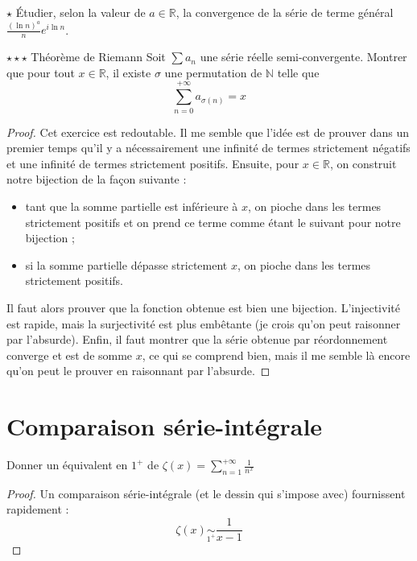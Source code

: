 \documentclass[french,a4paper]{article}
\newcommand{\N}{\mathbb{N}}
\newcommand{\R}{\mathbb{R}}
\theoremstyle{plain}
\theoremstyle{definition}
\theoremstyle{remark}
\begin{document}
\begin{ex}[Moulin.38]{$\star$}
	Étudier, selon la valeur de $a\in\R$, la convergence de la série de terme général $\displaystyle\frac{(\ln n)^a}{n}e^{i\ln n}$.
\end{ex}

\begin{ex}[X]{$\star\star\star$ Théorème de Riemann}
	Soit $\sum a_n$ une série réelle semi-convergente. Montrer que pour tout $x \in \R$, il existe $\sigma$ une permutation de $\N$ telle que $$\sum_{n=0}^{+\infty} a_{\sigma(n)}=x $$
\end{ex}
\begin{proof}
	Cet exercice est redoutable. Il me semble que l'idée est de prouver dans un premier temps qu'il y a nécessairement une infinité de termes strictement négatifs et une infinité de termes strictement positifs. Ensuite, pour $x\in\R$, on construit notre bijection de la façon suivante :
	\begin{itemize}
		\item tant que la somme partielle est inférieure à $x$, on pioche dans les termes strictement positifs et on prend ce terme comme étant le suivant pour notre bijection ;
		\item si la somme partielle dépasse strictement $x$, on pioche dans les termes strictement positifs.
	\end{itemize}
	Il faut alors prouver que la fonction obtenue est bien une bijection. L'injectivité est rapide, mais la surjectivité est plus embêtante (je crois qu'on peut raisonner par l'absurde). Enfin, il faut montrer que la série obtenue par réordonnement converge et est de somme $x$, ce qui se comprend bien, mais il me semble là encore qu'on peut le prouver en raisonnant par l'absurde.
\end{proof}
\section{Comparaison série-intégrale}

\begin{ex}[Moulin.39]{}
	Donner un équivalent en $1^+$ de $\displaystyle\zeta(x)=\sum_{n=1}^{+\infty}\frac{1}{n^x}$
\end{ex}
\begin{proof}
	Un comparaison série-intégrale (et le dessin qui s'impose avec) fournissent rapidement : $$\zeta(x)\underset{1^+}{\sim}\frac{1}{x-1}$$
\end{proof}
\end{document}
